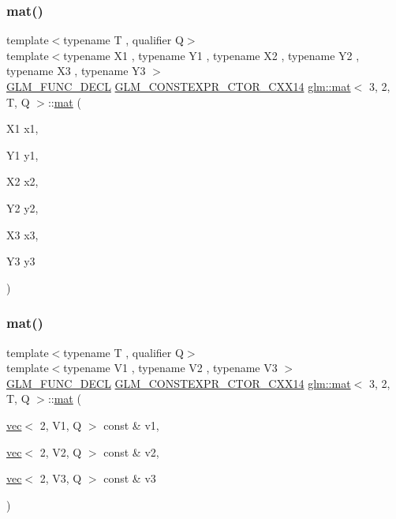 \subsubsection{\texorpdfstring{mat()}{mat()}\hspace{0.1cm}{\footnotesize\ttfamily [7/21]}}
{\footnotesize\ttfamily template$<$typename T , qualifier Q$>$ \\
template$<$typename X1 , typename Y1 , typename X2 , typename Y2 , typename X3 , typename Y3 $>$ \\
\hyperlink{setup_8hpp_ab2d052de21a70539923e9bcbf6e83a51}{G\+L\+M\+\_\+\+F\+U\+N\+C\+\_\+\+D\+E\+CL} \hyperlink{setup_8hpp_a0900f9145e68bf6061b6f5e7be3fa751}{G\+L\+M\+\_\+\+C\+O\+N\+S\+T\+E\+X\+P\+R\+\_\+\+C\+T\+O\+R\+\_\+\+C\+X\+X14} \hyperlink{structglm_1_1mat}{glm\+::mat}$<$ 3, 2, T, Q $>$\+::\hyperlink{structglm_1_1mat}{mat} (\begin{DoxyParamCaption}\item[{X1}]{x1,  }\item[{Y1}]{y1,  }\item[{X2}]{x2,  }\item[{Y2}]{y2,  }\item[{X3}]{x3,  }\item[{Y3}]{y3 }\end{DoxyParamCaption})}

\mbox{\label{structglm_1_1mat_3_013_00_012_00_01_t_00_01_q_01_4_a05957fdeea53e736c395bc5c818f87cd}} 
\subsubsection{\texorpdfstring{mat()}{mat()}\hspace{0.1cm}{\footnotesize\ttfamily [8/21]}}
{\footnotesize\ttfamily template$<$typename T , qualifier Q$>$ \\
template$<$typename V1 , typename V2 , typename V3 $>$ \\
\hyperlink{setup_8hpp_ab2d052de21a70539923e9bcbf6e83a51}{G\+L\+M\+\_\+\+F\+U\+N\+C\+\_\+\+D\+E\+CL} \hyperlink{setup_8hpp_a0900f9145e68bf6061b6f5e7be3fa751}{G\+L\+M\+\_\+\+C\+O\+N\+S\+T\+E\+X\+P\+R\+\_\+\+C\+T\+O\+R\+\_\+\+C\+X\+X14} \hyperlink{structglm_1_1mat}{glm\+::mat}$<$ 3, 2, T, Q $>$\+::\hyperlink{structglm_1_1mat}{mat} (\begin{DoxyParamCaption}\item[{\hyperlink{structglm_1_1vec}{vec}$<$ 2, V1, Q $>$ const \&}]{v1,  }\item[{\hyperlink{structglm_1_1vec}{vec}$<$ 2, V2, Q $>$ const \&}]{v2,  }\item[{\hyperlink{structglm_1_1vec}{vec}$<$ 2, V3, Q $>$ const \&}]{v3 }\end{DoxyParamCaption})}

